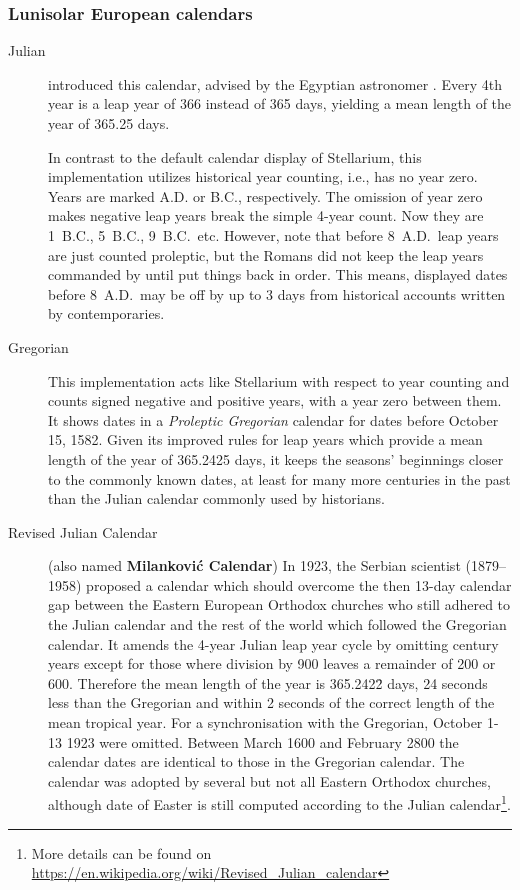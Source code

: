 \subsubsection{Lunisolar European calendars}
\begin{description}
\item[Julian]  introduced this calendar, advised
  by the Egyptian astronomer . Every 4th year is a
  leap year of 366 instead of 365 days, yielding a mean length of the
  year of 365.25 days.

  In contrast to the default calendar display of Stellarium, this
  implementation utilizes historical year counting, i.e., has no year
  zero. Years are marked A.D. or B.C., respectively.  The omission of
  year zero makes negative leap years break the simple 4-year
  count. Now they are 1~B.C., 5~B.C., 9~B.C.\ etc. However, note that
  before 8~A.D.\ leap years are just counted proleptic, but the Romans
  did not keep the leap years commanded by  until
   put things back in order. This means, displayed
  dates before 8~A.D.\ may be off by up to 3 days from historical
  accounts written by contemporaries.
\item[Gregorian] This implementation acts like Stellarium with respect
  to year counting and counts signed negative and positive years, with a year
  zero between them. It shows dates in a \emph{Proleptic Gregorian}
  calendar for dates before October 15, 1582. Given its improved rules
  for leap years which provide a mean length of the year of 365.2425 days,
  it keeps the seasons' beginnings closer to the
  commonly known dates, at least for many more centuries in the past
  than the Julian calendar commonly used by historians.
\item[Revised Julian Calendar] (also named \textbf{Milankovi\'c
  Calendar})  In 1923, the Serbian scientist
   (1879--1958) proposed a calendar which
  should overcome the then 13-day calendar gap between the Eastern
  European Orthodox churches who still adhered to the Julian calendar
  and the rest of the world which followed the Gregorian calendar.  It
  amends the 4-year Julian leap year cycle by omitting century years
  except for those where division by 900 leaves a remainder of 200 or
  600.  Therefore the mean length of the year is 365.242\={2} days, 24
  seconds less than the Gregorian and within 2 seconds of the correct
  length of the mean tropical year.  For a synchronisation with the
  Gregorian, October 1-13 1923 were omitted.  Between March 1600 and
  February 2800 the calendar dates are identical to those in the
  Gregorian calendar.  The calendar was adopted by several but not all
  Eastern Orthodox churches, although date of Easter is still computed
  according to the Julian calendar\footnote{More details can be found on
    \url{https://en.wikipedia.org/wiki/Revised_Julian_calendar}}.


\end{description}
